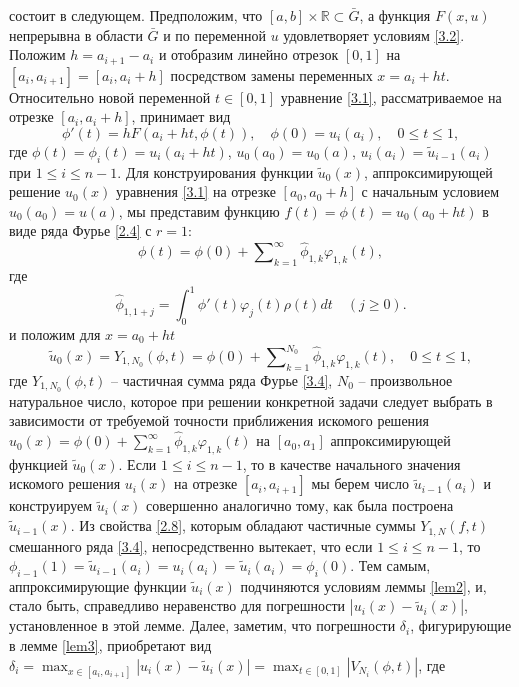 состоит в следующем.  Предположим, что $[a,b]\times\mathbb{R}\subset \bar G$, а  функция $F(x,u)$ непрерывна в области $\bar G$ и по переменной $u$  удовлетворяет условиям \eqref{3.2}. Положим $h=a_{i+1}-a_{i}$ и   отобразим линейно отрезок $[0,1]$ на $[a_i,a_{i+1}]=[a_i,a_i+h]$ посредством замены переменных  $x=a_i+ht$. Относительно новой переменной $t\in [0,1]$ уравнение \eqref{3.1}, рассматриваемое на отрезке $[a_i,a_i+h]$,  принимает вид
\begin{equation}\label{3.3}
\phi'(t)=hF(a_i+ht,\phi(t)), \quad \phi(0)= u_i(a_i),\quad 0\le t\le 1,
\end{equation}
где $\phi(t)=\phi_i(t)=u_i(a_i+ht)$, $u_0(a_0)=u_0(a)$, $ u_i(a_i)= \tilde u_{i-1}(a_i)$ при $1\le i\le n-1$. Для конструирования функции $\tilde u_0(x)$, аппроксимирующей решение $u_0(x)$ уравнения \eqref{3.1} на отрезке $[a_0,a_0+h]$ с начальным условием $u_0(a_0)=u(a)$, мы представим функцию $f(t)=\phi(t)=u_0(a_0+ht)$ в виде ряда Фурье \eqref{2.4} с $r=1$:
\begin{equation}\label{3.4}
\phi(t)= \phi(0)+ \sum\nolimits_{k=1}^\infty \hat \phi_{1,k}\varphi_{1,k}(t),
\end{equation}
где
\begin{equation*}
\hat \phi_{1,1+j}=\int_{0}^1 \phi'(t)\varphi_{j}(t)\rho(t)dt\quad(j\ge0).
\end{equation*}
и положим для $x=a_0+ht$
$$
\tilde u_0(x)=Y_{1,N_0}(\phi, t)= \phi(0)+ \sum\nolimits_{k=1}^{N_0} \hat \phi_{1,k}\varphi_{1,k}(t),\quad 0\le t\le 1,
$$
где $Y_{1,N_0}(\phi, t)$ -- частичная сумма ряда Фурье \eqref{3.4}, $N_0$ -- произвольное натуральное число, которое при решении конкретной задачи следует  выбрать в зависимости от требуемой точности приближения искомого решения $u_0(x)=\phi(0)+ \sum\nolimits_{k=1}^\infty \hat \phi_{1,k}\varphi_{1,k}(t)$ на $[a_0,a_1]$ аппроксимирующей функцией $\tilde u_0(x)$. Если  $1\le i\le n-1$, то в качестве начального значения искомого решения $u_i(x)$ на отрезке $[a_i,a_{i+1}]$ мы берем число $\tilde u_{i-1}(a_i)$ и конструируем $\tilde u_i(x)$ совершенно аналогично тому, как была построена $\tilde u_{i-1}(x)$.
Из свойства \eqref{2.8}, которым обладают частичные суммы $Y_{1,N}(f,t)$ смешанного ряда \eqref{3.4}, непосредственно вытекает, что если $1\le i\le n-1$, то $\phi_{i-1}(1)=\tilde u_{i-1}(a_i)=u_i(a_i)=\tilde u_i(a_i)=\phi_i(0)$. Тем самым, аппроксимирующие функции  $\tilde u_i(x)$ подчиняются условиям леммы \ref{lem2}, и, стало быть, справедливо неравенство для погрешности $ |u_i(x)-\tilde u_i(x)|$, установленное в этой лемме. Далее, заметим, что погрешности   $\delta_i $, фигурирующие в лемме  \ref{lem3}, приобретают вид $\delta_i=\max_{x\in[a_i,a_{i+1}]}|u_i(x)-\tilde u_i(x)|=\max_{t\in[0,1]}|V_{N_i}(\phi,t)|$, где
